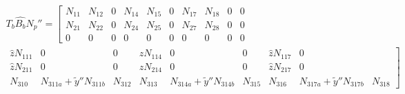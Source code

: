 \begin{multline*}
T_b \hat{B_b} N_p'' = \left[\begin{matrix}
N_{11} & N_{12} & 0 & N_{14} & N_{15} & 0 & N_{17} & N_{18} & 0 & 0 \\
N_{21} & N_{22} & 0 & N_{24} & N_{25} & 0 & N_{27} & N_{28} & 0 & 0 \\
0 & 0 & 0 & 0 & 0 & 0 & 0 & 0 & 0 & 0
\end{matrix} \right. \\
\left. \begin{matrix}
\hat{z} N_{111} & 0 & 0 & \hat{z} N_{114} & 0 & 0 & \hat{z} N_{117} & 0 \\ 
\hat{z} N_{211} & 0 & 0 & \hat{z} N_{214} & 0 & 0 & \hat{z} N_{217} & 0 \\ 
N_{310} & N_{311a} + \tilde{y}'' N_{311b} & N_{312} & N_{313} & N_{314a} + \tilde{y}'' N_{314b} & N_{315} & N_{316} & N_{317a} + \tilde{y}'' N_{317b} & N_{318}
\end{matrix}\right]
\end{multline*}

